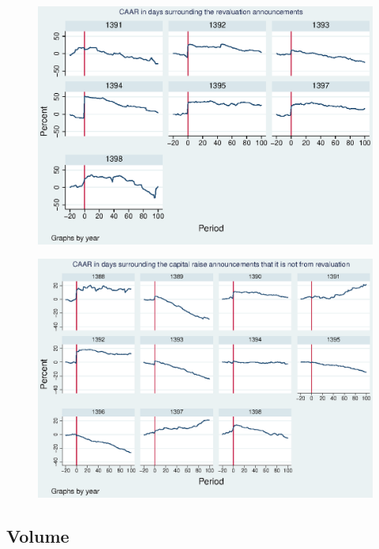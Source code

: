 \documentclass{beamer}
\begin{document}
\begin{frame}
\label{AbReturn_year_Revaluation}
\begin{figure}
\centering
\includegraphics[width=0.85\linewidth]{AbReturn_year_Revaluation.eps}
\label{fig:AbReturn_year_Revaluation}
\end{figure}


\end{frame}

\begin{frame}
\label{AbReturn_year_NoRevaluation}
\begin{figure}
\centering
\includegraphics[width=0.85\linewidth]{AbReturn_year_NoRevaluation.eps}
\label{fig:AbReturn_year_NoRevaluation}
\end{figure}


\end{frame}

\subsection{Volume}
\end{document}
